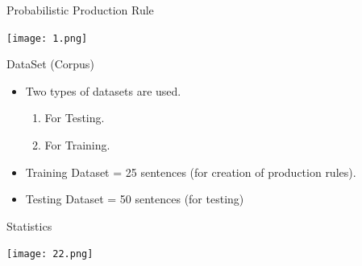 \documentclass{beamer}
\begin{document}
\begin{frame}{Probabilistic Production Rule}
\begin{center}
	\texttt{[image: 1.png]}	
\end{center}
\end{frame}




\begin{frame}{DataSet (Corpus)}
\begin{itemize}
	\item Two types of datasets are used. \\
	\vspace{0.5em}
	\begin{enumerate}
	\item For Testing.
	\item For Training.
	\end{enumerate}
	\vspace{1em}
	\item Training Dataset = 25 sentences (for creation of production rules).
	\item Testing Dataset = 50 sentences (for testing)
	\vspace{1em} 
\end{itemize}
\end{frame}



\begin{frame}{Statistics}
\begin{center}
	\texttt{[image: 22.png]}	
\end{center}
\end{frame}
\end{document}
